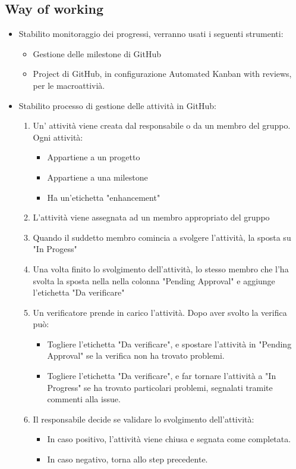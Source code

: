 \documentclass[a4paper, oneside, openany, dvipsnames, table]{article}
\begin{document}
\subsection{Way of working}
\begin{itemize}
\item Stabilito monitoraggio dei progressi, verranno usati i seguenti strumenti:
\begin{itemize}
	\item Gestione delle milestone di GitHub
	\item Project di GitHub, in configurazione Automated Kanban with reviews, per le macroattivià.
\end{itemize}


\item Stabilito processo di gestione delle attività in GitHub:
	\begin{enumerate}
	\item Un' attività viene creata dal responsabile o da un membro del gruppo. Ogni attività:
		\begin{itemize}
			\item Appartiene a un progetto
			\item Appartiene a una milestone
			\item Ha un'etichetta "enhancement"
		\end{itemize}
	\item L'attività viene assegnata ad un membro appropriato del gruppo
	\item Quando il suddetto membro comincia a svolgere l'attività, la sposta su "In Progess"
	\item Una volta finito lo svolgimento dell'attività, lo stesso membro che l'ha svolta la sposta nella
		  nella colonna "Pending Approval" e aggiunge l'etichetta "Da verificare"
	\item Un verificatore prende in carico l'attività. Dopo aver svolto la verifica può:
	\begin{itemize}
		\item Togliere l'etichetta "Da verificare", e spostare l'attività in "Pending Approval" se la verifica non ha trovato
			  problemi.
		\item Togliere l'etichetta "Da verificare", e far tornare l'attività a "In Progress" se ha trovato particolari problemi,
		      segnalati tramite commenti alla issue.
	\end{itemize}
	\item Il responsabile decide se validare lo svolgimento dell'attività:
	\begin{itemize}
		\item In caso positivo, l'attività viene chiusa e segnata come completata.
		\item In caso negativo, torna allo step precedente.
	\end{itemize}
	\end{enumerate}	
\end{itemize}




\newpage
\end{document}
